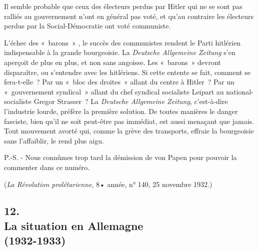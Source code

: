 \documentclass[french,twoside]{book} %
\begin{document}
Il semble probable que ceux des électeurs perdus par Hitler qui ne se sont pas ralliés au gouvernement n'ont en général pas voté, et qu'au contraire les électeurs perdus par la Social-Démocratie ont voté communiste.\par
L'échec des « barons » , le succès des communistes rendent le Parti hitlé­rien indispensable à la grande bourgeoisie. La {\itshape Deutsche Allgemeine Zeitung} s'en aperçoit de plus en plus, et non sans angoisse. Les « barons » devront disparaître, ou s'entendre avec les hitlériens. Si cette entente se fait, comment se fera-t-elle ? Par un « bloc des droites » allant du centre à Hitler ? Par un « gouvernement syndical » allant du chef syndical socialiste Leipart au national-socialiste Gregor Strasser ? La {\itshape Deutsche Allgemeine Zeitung}, c'est-à-dire l'industrie lourde, préfère la première solution. De toutes manières le danger fasciste, bien qu'il ne soit peut-être pas immédiat, est aussi menaçant que jamais. Tout mouvement avorté qui, comme la grève des transports, effraie la bourgeoisie sans l'affaiblir, le rend plus aigu.\par
P.-S. - Nous connûmes trop tard la démission de von Papen pour pouvoir la commenter dans ce numéro.\par
\par
({\itshape La Révolution prolétarienne}, 8• année, n° 140, 25 novembre 1932.)\par

\subsection[12. La situation en Allemagne  (1932-1933)]{12. \\
La situation en Allemagne \protect\footnotemark  \\
(1932-1933)}
\noindent \par
\end{document}
